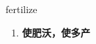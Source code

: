 
\begin{frame}
{\huge fertilize}
\begin{center}
\begin{enumerate}\Large
  \item \textbf{使肥沃，使多产}
\end{enumerate}
\end{center}
\end{frame}
